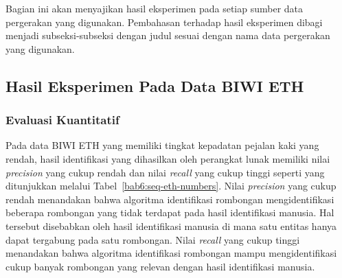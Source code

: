 Bagian ini akan menyajikan hasil eksperimen pada setiap sumber data pergerakan yang digunakan. Pembahasan terhadap hasil eksperimen dibagi menjadi subseksi-subseksi dengan judul sesuai dengan nama data pergerakan yang digunakan.

\subsection{Hasil Eksperimen Pada Data BIWI ETH}
\label{subsec:eth-result}

\subsubsection{Evaluasi Kuantitatif}
\label{subsubsec:eth-quantitative}

Pada data BIWI ETH yang memiliki tingkat kepadatan pejalan kaki yang rendah, hasil identifikasi yang dihasilkan oleh perangkat lunak memiliki nilai \textit{precision} yang cukup rendah dan nilai \textit{recall} yang cukup tinggi seperti yang ditunjukkan melalui Tabel~\ref{bab6:seq-eth-numbers}. Nilai \textit{precision} yang cukup rendah menandakan bahwa algoritma identifikasi rombongan mengidentifikasi beberapa rombongan yang tidak terdapat pada hasil identifikasi manusia. Hal tersebut disebabkan oleh hasil identifikasi manusia di mana satu entitas hanya dapat tergabung pada satu rombongan. Nilai \textit{recall} yang cukup tinggi menandakan bahwa algoritma identifikasi rombongan mampu
mengidentifikasi cukup banyak rombongan yang relevan dengan hasil identifikasi manusia.

